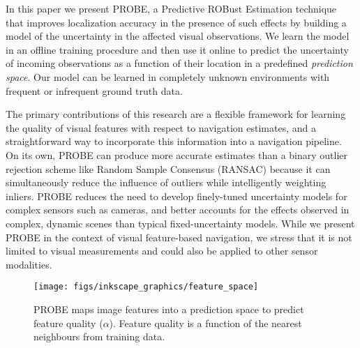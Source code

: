 \documentclass[letterpaper, 10 pt, conference]{ieeeconf}  %
\begin{document}
In this paper we present PROBE, a Predictive ROBust Estimation technique that improves localization accuracy in the presence of such effects by building a model of the uncertainty in the affected visual observations. 
We learn the model in an offline training procedure and then use it online to predict the uncertainty of incoming observations as a function of their location in a predefined \emph{prediction space}.
Our model can be learned in completely unknown environments with frequent or infrequent ground truth data. 

The primary contributions of this research are a flexible framework for learning the quality of visual features with respect to navigation estimates, and a straightforward way to incorporate this information into a navigation pipeline. On its own, PROBE can produce more accurate estimates than a binary outlier rejection scheme like Random Sample Consensus (RANSAC) \cite{Fischler:1981cv} because it can simultaneously reduce the influence of outliers while intelligently weighting inliers. PROBE reduces the need to develop finely-tuned uncertainty models for complex sensors such as cameras, and better accounts for the effects observed in complex, dynamic scenes than typical fixed-uncertainty models. While we present PROBE in the context of visual feature-based navigation, we stress that it is not limited to visual measurements and could also be applied to other sensor modalities.

\begin{figure}[t]
    \vspace{0.3cm}
    \centering
    \texttt{[image: figs/inkscape\_graphics/feature\_space]}
    \caption{PROBE maps image features into a prediction space to predict feature quality ($\alpha$). Feature quality is a function of the nearest neighbours from training data.}
    \label{fig:feature_space}
    \vspace{-0.25cm}
\end{figure}
\end{document}

